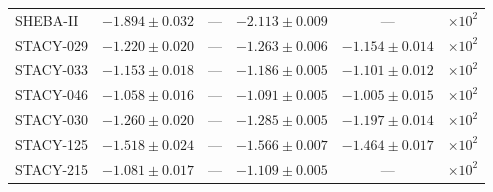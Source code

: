 \documentclass[12pt,preprint]{elsarticle}
\begin{document}
\begin{table}[H]
\begin{tabular}{@{}lccccc@{}}
SHEBA-II     & $-1.894 \pm 0.032$ & ---                 & $-2.113 \pm 0.009$  & ---                & $\times 10^2$ \\
STACY-029    & $-1.220 \pm 0.020$ & ---                 & $-1.263 \pm 0.006$  & $-1.154 \pm 0.014$ & $\times 10^2$ \\
STACY-033    & $-1.153 \pm 0.018$ & ---                 & $-1.186 \pm 0.005$  & $-1.101 \pm 0.012$ & $\times 10^2$ \\
STACY-046    & $-1.058 \pm 0.016$ & ---                 & $-1.091 \pm 0.005$  & $-1.005 \pm 0.015$ & $\times 10^2$ \\
STACY-030    & $-1.260 \pm 0.020$ & ---                 & $-1.285 \pm 0.005$  & $-1.197 \pm 0.014$ & $\times 10^2$ \\
STACY-125    & $-1.518 \pm 0.024$ & ---                 & $-1.566 \pm 0.007$  & $-1.464 \pm 0.017$ & $\times 10^2$ \\
STACY-215    & $-1.081 \pm 0.017$ & ---                 & $-1.109 \pm 0.005$  & ---                & $\times 10^2$ \\
\bottomrule
\end{tabular}
\end{table}
\end{document}
